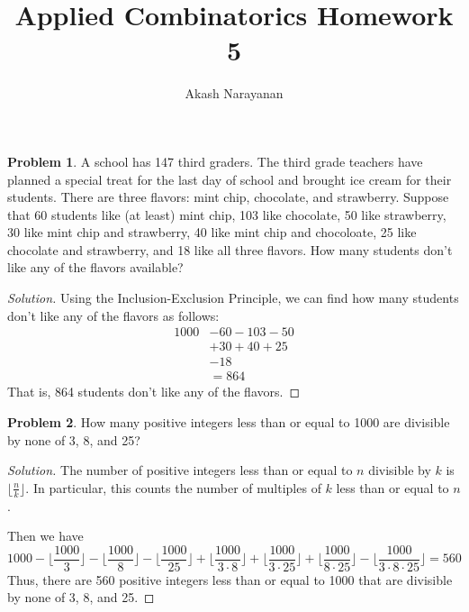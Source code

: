 \documentclass[12pt]{article}
\title{Applied Combinatorics Homework 5}
\author{Akash Narayanan}
\newcounter{chapternumber}
\theoremstyle{definition}
\newtheorem{problem-internal}{Problem}[chapternumber]
\newenvironment{problem}{
  \medskip
  \begin{problem-internal}
}{
\end{problem-internal}
}
\newenvironment{solution}{
  \begin{proof}[Solution]
    \vspace{-8px}
    \setlength{\parskip}{4px}
    \setlength{\parindent}{0px}
}{
\end{proof}
}
\begin{document}
  \maketitle

  \setcounter{chapternumber}{7}
  \begin{problem}
    A school has 147 third graders. The third grade teachers have planned a special treat for the last day of school and brought ice cream for their students.
    There are three flavors: mint chip, chocolate, and strawberry.
    Suppose that 60 students like (at least) mint chip, 103 like chocolate, 50 like strawberry, 30 like mint chip and strawberry, 40 like mint chip and chocoloate, 25 like chocolate and strawberry, and 18 like all three flavors.
    How many students don't like any of the flavors available?
  \end{problem}

  \begin{solution}
    Using the Inclusion-Exclusion Principle, we can find how many students don't like any of the flavors as follows:
    \begin{align*}
      1000 &- 60 - 103 - 50 \\
           &+ 30 +  40 + 25 \\
           &- 18 \\
           &= 864
    \end{align*}
    That is, 864 students don't like any of the flavors.
  \end{solution}


  \setcounter{problem-internal}{4}
  \begin{problem}
    How many positive integers less than or equal to 1000 are divisible by none of 3, 8, and 25?
  \end{problem}

  \begin{solution}
    The number of positive integers less than or equal to \(n\) divisible by \(k\) is \(\lfloor{\frac{n}{k}}\rfloor\). In particular, this counts the number of multiples of \(k\) less than or equal to \(n\).

    Then we have
    \begin{displaymath}
      1000 - \lfloor{\frac{1000}{3}}\rfloor - \lfloor{\frac{1000}{8}}\rfloor - \lfloor{\frac{1000}{25}}\rfloor + \lfloor{\frac{1000}{3 \cdot 8}}\rfloor + \lfloor{\frac{1000}{3 \cdot 25}}\rfloor + \lfloor{\frac{1000}{8 \cdot 25}}\rfloor - \lfloor{\frac{1000}{3 \cdot 8 \cdot 25}}\rfloor = 560
    \end{displaymath}
    Thus, there are 560 positive integers less than or equal to 1000 that are divisible by none of 3, 8, and 25.
  \end{solution}
\end{document}
